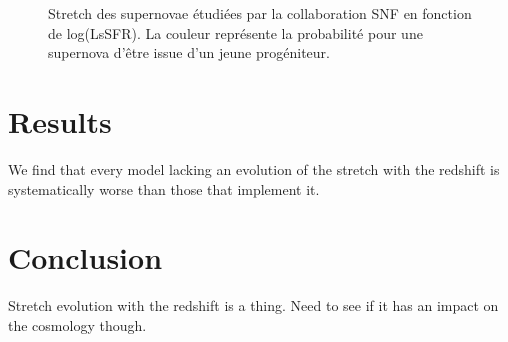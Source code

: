 \documentclass{aa}
\begin{document}
\begin{figure}[htbp!]
    \centering
    \caption{Stretch des supernovae étudiées par la collaboration SNF en
    fonction de log(LsSFR). La couleur représente la probabilité pour une
supernova d'être issue d'un jeune progéniteur.}
    \label{fig:mod_first}
\end{figure}

\section{Results}
We find that every model lacking an evolution of the stretch with the redshift
is systematically worse than those that implement it.

\section{Conclusion}
Stretch evolution with the redshift is a thing. Need to see if it has an impact
on the cosmology though.
\end{document}
